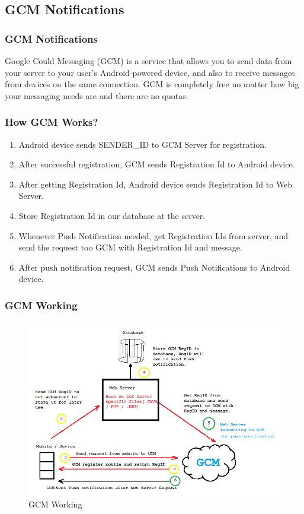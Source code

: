 \documentclass{beamer}   %
\begin{document}
\subsection{GCM Notifications}
\begin{frame}
\frametitle{GCM Notifications}
Google Could Messaging (GCM) is a service that allows you to send data from your server to your user's Android-powered device, and also to receive messages from devices on the same connection. GCM is completely free no matter how big your messaging needs are and there are no quotas.
 
\end{frame}

\begin{frame}
\frametitle{How GCM Works?}
\begin{enumerate}
\item Android device sends SENDER\_ID to GCM Server for registration. \pause
\item After successful registration, GCM sends Registration Id to Android device.\pause
\item After getting Registration Id, Android device sends Registration Id to Web Server.\pause
\item Store Registration Id in our database at the server.\pause
\item Whenever Push Notification needed, get Registration Ids from server, and send the request too GCM with Registration Id and message.\pause
\item After push notification request, GCM sends Push Notifications to Android device.
\end{enumerate}
\end{frame}

\begin{frame}
\frametitle{GCM Working}
\begin{figure}
\includegraphics[scale=0.25]{image/gcm.png}
\caption{GCM Working}
\end{figure}

\end{frame}
\end{document}
